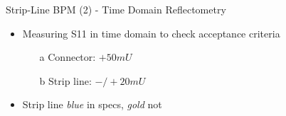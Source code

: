 \documentclass{beamer}
\begin{document}
\begin{frame}[t,fragile]{Strip-Line BPM (2) - Time Domain Reflectometry}
\begin{itemize}
\item Measuring S11 in time domain to check acceptance criteria
\begin{itemize}
\item[a] Connector: $+ 50 mU$ 
\item[b] Strip line: $-/+ 20mU$
\end{itemize}
\item Strip line \textit{blue} in specs, \textit{gold} not
\end{itemize}

\begin{figure}
  \centering
  \quad
  \\
\end{figure}

\end{frame}
\end{document}

